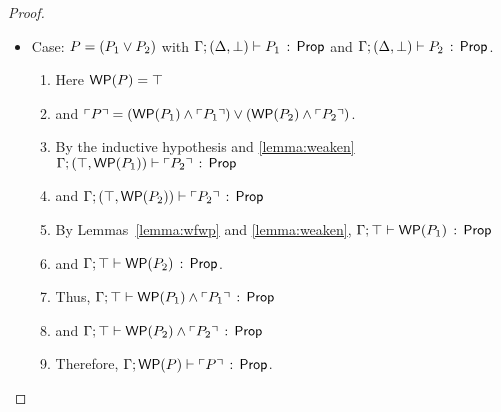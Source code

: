 \documentclass[10pt,a4paper]{article}
\begin{document}
\begin{proof}
\begin{itemize}
  \item Case: $P = (P_1 \vee P_2)$ with
       $\Gamma;(\Delta,\bot) \vdash P_1\, :\, \mathsf{Prop}$ and 
              $\Gamma;(\Delta,\bot) \vdash P_2\, :\, \mathsf{Prop}$.
      	\begin{enumerate}
		\item
                  Here $\mathop{\mathsf{WP}}(P) = \top$
                \item 
                  and $\ulcorner P \urcorner = 
                  (\mathop{\mathsf{WP}}(P_1) \wedge \ulcorner P_1 \urcorner) \vee (\mathop{\mathsf{WP}}(P_2) \wedge \ulcorner P_2 \urcorner)$.
		\item
                  By the inductive hypothesis and \ref{lemma:weaken}
                  $\Gamma;(\top,\mathop{\mathsf{WP}}(P_1)) \vdash \ulcorner P_2 \urcorner\, :\, \mathsf{Prop}$ 
                \item
                  and
                  $\Gamma;(\top,\mathop{\mathsf{WP}}(P_2)) \vdash \ulcorner P_2 \urcorner\, :\, \mathsf{Prop}$ 
		\item
                  By Lemmas~\ref{lemma:wfwp} and \ref{lemma:weaken},
                  $\Gamma;\top \vdash \mathop{\mathsf{WP}}(P_1)\, :\, \mathsf{Prop}$
                \item
                  and
                  $\Gamma;\top \vdash \mathop{\mathsf{WP}}(P_2)\, :\, \mathsf{Prop}$.
		\item
                  Thus, 
                  $\Gamma;\top \vdash \mathop{\mathsf{WP}}(P_1) \wedge \ulcorner P_1 \urcorner\, :\, \mathsf{Prop}$
                \item
                  and 
                  $\Gamma;\top \vdash \mathop{\mathsf{WP}}(P_2) \wedge \ulcorner P_2 \urcorner\, :\, \mathsf{Prop}$
		\item
                  Therefore,
                  $\Gamma;\mathop{\mathsf{WP}}(P) \vdash \ulcorner P \urcorner\, :\, \mathsf{Prop}$.
		\end{enumerate}    
      

\end{itemize}
\end{proof}
\end{document}
